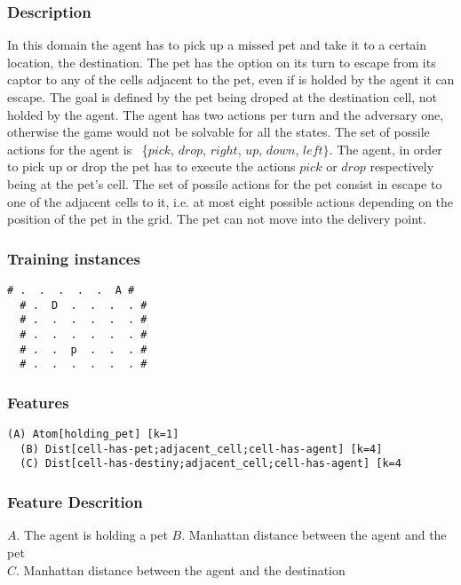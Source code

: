 \documentclass[a4paper]{article}
\begin{document}
\subsubsection{Description}

In this domain the agent has to pick up a missed pet and take it to a certain location, the destination. The pet has the option on its turn to escape from its captor to any of the cells adjacent to the pet, even if is holded by the agent it can escape. The goal is defined by the pet being droped at the destination cell, not holded by the agent. The agent has two actions per turn and the adversary one, otherwise the game would not be solvable for all the states. The set of possile actions for the agent is ~\{$pick$, $drop$, $right$, $up$, $down$, $left\}$. The agent, in order to pick up or drop the pet has to execute the actions $pick$ or $drop$ respectively being at the pet's cell. The set of possile actions for the pet consist in escape to one of the adjacent cells to it, i.e. at most eight possible actions depending on the position of the pet in the grid. The pet can not move into the delivery point.

\subsubsection{Training instances}
\begin{Verbatim}[fontsize=\footnotesize]
  # .  .  .  .  .  A #
  # .  D  .  .  .  . #
  # .  .  .  .  .  . #
  # .  .  .  .  .  . #
  # .  .  p  .  .  . #
  # .  .  .  .  .  . #
\end{Verbatim}

\subsubsection{Features}
\begin{Verbatim}[fontsize=\footnotesize]
  (A) Atom[holding_pet] [k=1]
  (B) Dist[cell-has-pet;adjacent_cell;cell-has-agent] [k=4]
  (C) Dist[cell-has-destiny;adjacent_cell;cell-has-agent] [k=4
\end{Verbatim}

\subsubsection{Feature Descrition}
$A$. The agent is holding a pet
$B$. Manhattan distance between the agent and the pet\\
$C$. Manhattan distance between the agent and the destination
\end{document}
